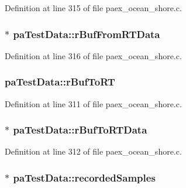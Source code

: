 Definition at line 315 of file paex\+\_\+ocean\+\_\+shore.\+c.

\subsubsection[{\texorpdfstring{r\+Buf\+From\+R\+T\+Data}{rBufFromRTData}}]{$\ast$ pa\+Test\+Data\+::r\+Buf\+From\+R\+T\+Data}\hypertarget{structpa_test_data_ab867d0c765fb0d8e59a2396824ee2b26}{}\label{structpa_test_data_ab867d0c765fb0d8e59a2396824ee2b26}


Definition at line 316 of file paex\+\_\+ocean\+\_\+shore.\+c.

\subsubsection[{\texorpdfstring{r\+Buf\+To\+RT}{rBufToRT}}]{ pa\+Test\+Data\+::r\+Buf\+To\+RT}\hypertarget{structpa_test_data_aafa0a9bff782eaa64a138eb9ef6f7207}{}\label{structpa_test_data_aafa0a9bff782eaa64a138eb9ef6f7207}


Definition at line 311 of file paex\+\_\+ocean\+\_\+shore.\+c.

\subsubsection[{\texorpdfstring{r\+Buf\+To\+R\+T\+Data}{rBufToRTData}}]{$\ast$ pa\+Test\+Data\+::r\+Buf\+To\+R\+T\+Data}\hypertarget{structpa_test_data_aa2e7dd040f4bef5a3e0a10b7c63eb1d9}{}\label{structpa_test_data_aa2e7dd040f4bef5a3e0a10b7c63eb1d9}


Definition at line 312 of file paex\+\_\+ocean\+\_\+shore.\+c.

\subsubsection[{\texorpdfstring{recorded\+Samples}{recordedSamples}}]{$\ast$ pa\+Test\+Data\+::recorded\+Samples}\hypertarget{structpa_test_data_ab0c376a16c326617661d8a55ed5c8399}{}\label{structpa_test_data_ab0c376a16c326617661d8a55ed5c8399}


